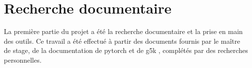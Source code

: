 \section{Recherche documentaire}
La première partie du projet a été la recherche documentaire et la prise en main des outils.
Ce travail a été effectué à partir des documents fournis par le maître de stage, de la documentation de \gls{pytorch} \autocite{60MinBlitzTorch,ByExampleTorch,Classify,doc_pytorch} et de \gls{g5k} \autocite{TutoIbadaG5k,DeepLoriaG5k}, complétés par des recherches personnelles.

